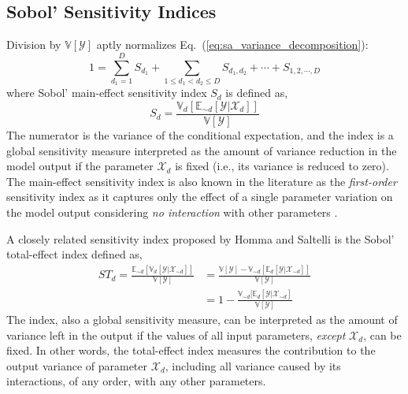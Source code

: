 \subsection{Sobol' Sensitivity Indices}\label{sub:sa_sobol_indices}

Division by $\mathbb{V}[\mathcal{Y}]$ aptly normalizes Eq.~(\ref{eq:sa_variance_decomposition}):
\begin{equation}
  1 = \sum_{d_1 = 1}^{D} S_{d_1} + \sum_{1 \leq d_1 < d_2 \leq D} S_{d_1,d_2} + \cdots + S_{1,2,\cdots,D}
\label{eq:sa_normalized_variance}
\end{equation}
where Sobol' main-effect sensitivity index $S_d$ is defined as,
\begin{equation}
  S_d = \frac{\mathbb{V}_d [\mathbb{E}_{\sim d} [\mathcal{Y}|\mathcal{X}_d]]}{\mathbb{V}[\mathcal{Y}]}
\label{eq:sa_main_effect_index}
\end{equation}
The numerator is the variance of the conditional expectation,
and the index is a global sensitivity measure interpreted as the amount of variance reduction in the model output if the parameter $\mathcal{X}_d$ is fixed (i.e., its variance is reduced to zero).
The main-effect sensitivity index is also known in the literature as the \emph{first-order} sensitivity index 
as it captures only the effect of a single parameter variation on the model output considering \emph{no interaction} with other parameters \cite{Saltelli2002}.

A closely related sensitivity index proposed by Homma and Saltelli \cite{Homma1996} is the Sobol' total-effect index defined as,
\begin{equation}
  \begin{split}
    ST_{d} = \frac{\mathbb{E}_{\sim d}[\mathbb{V}_{d}[\mathcal{Y}|\bm{\mathcal{X}}_{\sim d}]]}{\mathbb{V}[\mathcal{Y}]}
           & = \frac{\mathbb{V}[\mathcal{Y}] - \mathbb{V}_{\sim d}\left[\mathbb{E}_{d}\left[\mathcal{Y}|\bm{\mathcal{X}}_{\sim d}\right]\right]}{\mathbb{V}[\mathcal{Y}]} \\
           & = 1 - \frac{\mathbb{V}_{\sim d}[\mathbb{E}_{d}[\mathcal{Y}|\bm{\mathcal{X}}_{\sim d}]}{\mathbb{V}[\mathcal{Y}]}
  \end{split}
\label{eq:sa_total_effect_index}
\end{equation}
The index, also a global sensitivity measure, can be interpreted as the amount of variance left in the output if the values of all input parameters, \emph{except} $\mathcal{X}_d$, can be fixed.
In other words, the total-effect index measures the contribution to the output variance of parameter $\mathcal{X}_d$, including all variance caused by its interactions, of any order, with any other parameters.

